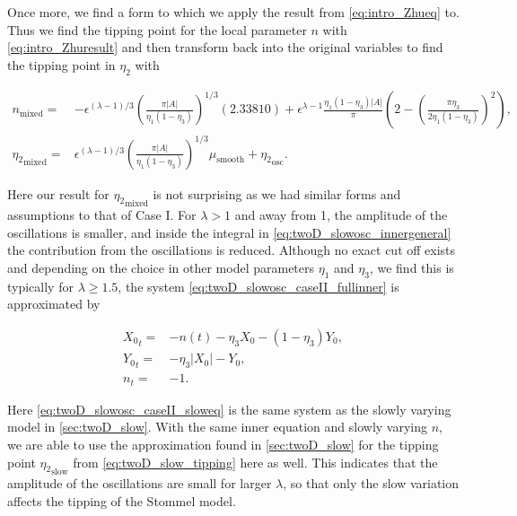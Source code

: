 Once more, we find a form to which we apply the result from \eqref{eq:intro_Zhueq} to. Thus we find the tipping point for the local parameter $n$ with \eqref{eq:intro_Zhuresult} and then transform back into the original variables to find the tipping point in $\eta_2$ with

\begin{equation}
\begin{aligned}
n_{\text{mixed}}=&-\epsilon^{(\lambda-1)/3}\left(\frac{\pi|A|}{\eta_1(1-\eta_3)}\right)^{1/3}(2.33810)+\epsilon^{\lambda-1}\frac{\eta_1(1-\eta_3)|A|}{\pi}\left(2-\left(\frac{\pi\eta_3}{2\eta_1(1-\eta_3)}\right)^2\right),\\
{\eta_2}_{\text{mixed}}=& \epsilon^{(\lambda-1)/3}\left(\frac{\pi|A|}{\eta_1(1-\eta_3)}\right)^{1/3}\mu_{\text{smooth}}+{\eta_2}_{\text{osc}}.
\end{aligned}
\end{equation}

Here our result for ${\eta_2}_{\text{mixed}}$ is not surprising as we had similar forms and assumptions to that of Case I. For $\lambda>1$ and away from 1, the amplitude of the oscillations is smaller, and inside the integral in \eqref{eq:twoD_slowosc_innergeneral} the contribution from the oscillations is reduced. Although no exact cut off exists and depending on the choice in other model parameters $\eta_1$ and $\eta_3$, we find this is typically for $\lambda\ge 1.5$, the system \eqref{eq:twoD_slowosc_caseII_fullinner} is approximated by

\begin{equation}\label{eq:twoD_slowosc_caseII_sloweq}
\begin{aligned}
{X_0}_t =& -n(t)-\eta_3 X_0 -(1-\eta_3)Y_0,\\
{Y_0}_t =&-\eta_3|X_0|-Y_0,\\
n_t =&-1.
\end{aligned}
\end{equation}

Here \eqref{eq:twoD_slowosc_caseII_sloweq} is the same system as the slowly varying model in \autoref{sec:twoD_slow}. With the same inner equation and slowly varying $n$, we are able to use the approximation found in \autoref{sec:twoD_slow} for the tipping point ${\eta_2}_{\text{slow}}$ from \eqref{eq:twoD_slow_tipping} here as well. This indicates that the amplitude of the oscillations are small for larger $\lambda$, so that only the slow variation affects the tipping of the Stommel model.

